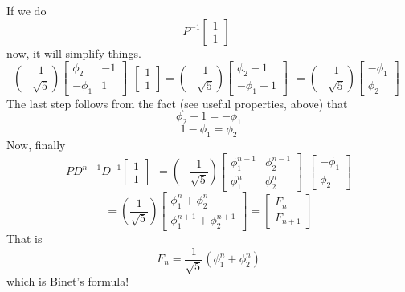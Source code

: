 \documentclass[11pt, oneside]{article}
\begin{document}
If we do 
\[ P^{-1}
\begin{bmatrix} 
   1 \\ 
   1 
\end{bmatrix} \ \
\]
now, it will simplify things.
\[
(-\frac{1}{\sqrt{5}})
\begin{bmatrix} 
  \phi_2  &  -1 \\ 
  -\phi_1  &  1 
\end{bmatrix} \ \ 
\begin{bmatrix} 
   1 \\ 
   1 
\end{bmatrix} 
= 
(-\frac{1}{\sqrt{5}})
\begin{bmatrix} 
  \phi_2 - 1  \\ 
  -\phi_1 +  1 
\end{bmatrix} \ \ 
= 
(-\frac{1}{\sqrt{5}})
\begin{bmatrix} 
  -\phi_1  \\ 
  \phi_2 
\end{bmatrix} \ \ 
\]
The last step follows from the fact (see useful properties, above) that 
\[ \phi_2 - 1 = - \phi_1 \]
\[ 1 - \phi_1 = \phi_2 \]
Now, finally
\[ PD^{n-1}D^{-1}
\begin{bmatrix} 
  1  \\ 
  1
\end{bmatrix} \ \ 
=
(-\frac{1}{\sqrt{5}})
\begin{bmatrix} 
  \phi_1^{n-1}  &  \phi_2^{n-1} \\ 
  \phi_1^n  &  \phi_2^n 
\end{bmatrix} \ \ 
\begin{bmatrix} 
  -\phi_1  \\ 
  \phi_2 
\end{bmatrix}
\]
\[
=
(\frac{1}{\sqrt{5}})
\begin{bmatrix} 
  \phi_1^{n}  +  \phi_2^{n} \\ 
  \phi_1^{n+1}  +  \phi_2^{n+1} 
\end{bmatrix} =
\begin{bmatrix} 
  F_{n} \\ 
  F_{n+1} 
\end{bmatrix}
\]
That is
\[ F_n = \frac{1}{\sqrt{5}} ( \phi_1^{n}  +  \phi_2^{n} ) \]
which is Binet's formula!
\end{document}
